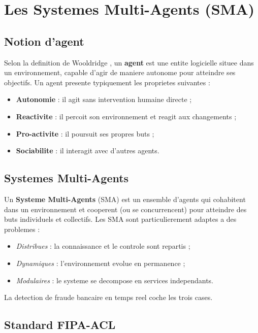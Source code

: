 \documentclass[12pt,a4paper,oneside]{report}
\begin{document}
\section{Les Systemes Multi-Agents (SMA)}

\subsection{Notion d'agent}

Selon la definition de Wooldridge \cite{wooldridge2009introduction}, un
\textbf{agent} est une entite logicielle situee dans un environnement, capable
d'agir de maniere autonome pour atteindre ses objectifs. Un agent presente
typiquement les proprietes suivantes :

\begin{itemize}[leftmargin=*]
  \item \textbf{Autonomie} : il agit sans intervention humaine directe ;
  \item \textbf{Reactivite} : il percoit son environnement et reagit aux
        changements ;
  \item \textbf{Pro-activite} : il poursuit ses propres buts ;
  \item \textbf{Sociabilite} : il interagit avec d'autres agents.
\end{itemize}

\subsection{Systemes Multi-Agents}

Un \textbf{Systeme Multi-Agents} (SMA) est un ensemble d'agents qui cohabitent
dans un environnement et cooperent (ou se concurrencent) pour atteindre des
buts individuels et collectifs. Les SMA sont particulierement adaptes a des
problemes :

\begin{itemize}[leftmargin=*]
  \item \emph{Distribues} : la connaissance et le controle sont repartis ;
  \item \emph{Dynamiques} : l'environnement evolue en permanence ;
  \item \emph{Modulaires} : le systeme se decompose en services
        independants.
\end{itemize}

La detection de fraude bancaire en temps reel coche les trois cases.

\subsection{Standard FIPA-ACL}
\end{document}
